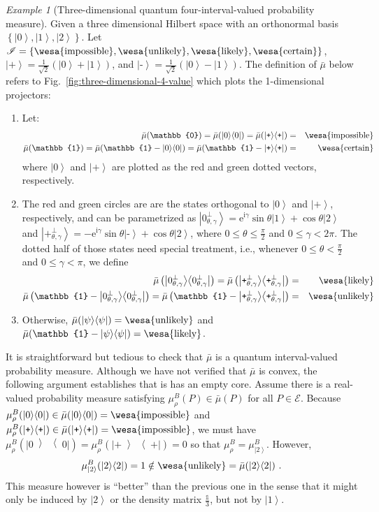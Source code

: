 \documentclass{article}
\theoremstyle{remark}
\newtheorem{example}{Example}
\newcommand{\events}{\ensuremath{\mathcal{E}}}
\newcommand{\imposs}{{\mbox{\wesa{impossible}}}}
\newcommand{\likely}{{\mbox{\wesa{likely}}}}
\newcommand{\unlikely}{{\mbox{\wesa{unlikely}}}}
\newcommand{\necess}{{\mbox{\wesa{certain}}}}
\newcommand{\ket}[1]{{\left\vert{#1}\right\rangle}}
\newcommand{\op}[2]{\ensuremath{\left\vert{#1}\middle\rangle\middle\langle{#2}\right\vert}}
\newcommand{\proj}[1]{\op{#1}{#1}}
\newcommand{\ps}{\texttt{+}}
\newcommand{\ms}{\texttt{-}}
\newcommand{\rme}{\mathrm{e}}
\newcommand{\rmi}{\mathrm{i}}
\begin{document}
\begin{example}[Three-dimensional quantum four-interval-valued 
  probability measure]\label{ex:three-dimensional-4-value}
  Given a three dimensional Hilbert space with an orthonormal basis
  $\left\{ \ket{0},\ket{1},\ket{2}\right\} $.  Let \emph{
  }$\mathscr{I}=\left\{ \imposs,\unlikely,\likely,\necess\right\} $,
  $\ket{\ps}=\frac{1}{\sqrt{2}}(\ket{0}+\ket{1})$, and
  $\ket{\ms}=\frac{1}{\sqrt{2}}(\ket{0}-\ket{1})$. The definition of
  $\bar{\mu}$ below refers to Fig.~\ref{fig:three-dimensional-4-value}
  which plots the 1-dimensional projectors:
\begin{enumerate}
\item Let:
\begin{eqnarray*}
\bar{\mu}(\mathbb{0})=\bar{\mu}(\proj{0})=\bar{\mu}(\proj{\ps}) 
  &=& \imposs \\
\bar{\mu}(\mathbb{1})=\bar{\mu}(\mathbb{1}-\proj{0})=\bar{\mu}(\mathbb{1}-\proj{\ps}) 
  &=& \necess
\end{eqnarray*}
where $\ket{0}$ and $\ket{\ps}$ are plotted as the red and green dotted
vectors, respectively.
\item The red and green circles are are the states orthogonal to
  $\ket{0}$ and $\ket{\ps}$, respectively, and can be parametrized as
  $\ket{0_{\theta,\gamma}^{\perp}}=\rme^{\rmi\gamma}\sin\theta\ket{1}+\cos\theta\ket{2}$
  and
  $\ket{\ps_{\theta,\gamma}^{\perp}}=-\rme^{\rmi\gamma}\sin\theta\ket{\ms}+\cos\theta\ket{2}$,
  where $0\le\theta\le\frac{\pi}{2}$ and $0\le\gamma<2\pi$. The dotted
  half of those states need special treatment, i.e., whenever
  $0\le\theta<\frac{\pi}{2}$ and $0\le\gamma<\pi$, we define
\begin{eqnarray*}
\bar{\mu}\left(\proj{0_{\theta,\gamma}^{\perp}}\right)=\bar{\mu}\left(\proj{\ps_{\theta,\gamma}^{\perp}}\right)
  &=& \likely \\
\bar{\mu}\left(\mathbb{1}-\proj{0_{\theta,\gamma}^{\perp}}\right)=
  \bar{\mu}\left(\mathbb{1}-\proj{\ps_{\theta,\gamma}^{\perp}}\right) 
  &=& \unlikely
\end{eqnarray*}
\item Otherwise, $\bar{\mu}(\proj{\psi})=\unlikely$ and $\bar{\mu}(\mathbb{1}-\proj{\psi})=\likely$. 
\end{enumerate}
It is straightforward but tedious to check that $\bar{\mu}$ is a
quantum interval-valued probability measure. Although we have not
verified that $\bar{\mu}$ is convex, the following argument establishes
that is has an empty core. Assume there is a real-valued probability
measure satisfying $\mu_{\rho}^{B}(P)\in\bar{\mu}(P)$ for all $P\in\events$.
Because $\mu_{\rho}^{B}(\proj{0})\in\bar{\mu}(\proj{0})=\imposs$
and $\mu_{\rho}^{B}(\proj{\ps})\in\bar{\mu}(\proj{\ps})=\imposs$,
we must have $\mu_{\rho}^{B}(\proj{0})=\mu_{\rho}^{B}(\proj{\ps})=0$
so that $\mu_{\rho}^{B}=\mu_{\ket{2}}^{B}$. However, 
\[
\mu_{\ket{2}}^{B}(\proj{2})=1\notin\unlikely=\bar{\mu}(\proj{2})\textrm{ .}
\]
This measure however is ``better'' than the previous one in the
sense that it might only be induced by $\ket{2}$ or the density matrix
$\frac{\mathbb{1}}{3}$, but not by $\ket{1}$. \end{example}
\end{document}
